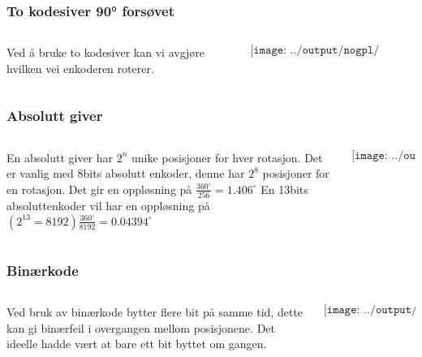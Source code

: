 \documentclass[aspectratio=169,xcolor=dvipsnames]{beamer}
\begin{document}
\begin{frame}
	\frametitle{To kodesiver 90° forsøvet}
	\begin{columns}
		\begin{column}{0.5\textwidth}
Ved å bruke to kodesiver kan vi avgjøre hvilken vei enkoderen roterer. 
		\end{column}

		\begin{column}{0.5\textwidth}
	$$\texttt{[image: ../output/nogpl/TurtallPosisjon04.png]}$$
		\end{column}
	\end{columns}
\end{frame}

\begin{frame}
	\frametitle{Absolutt giver}
	\begin{columns}
		\begin{column}{0.5\textwidth}
			En absolutt giver har $2^n$ unike posisjoner for hver rotasjon. 
			\vskip 1cm
			Det er vanlig med 8bits absolutt enkoder, denne har $2^8$ posisjoner for en rotasjon. Det gir en oppløsning på $\frac{360^\circ}{256}=1.406^\circ$
			\vskip 1cm
			En 13bits absoluttenkoder vil har en oppløsning på $(2^{13}=8192) \frac{360^\circ}{8192} =0.04394^\circ$
		\end{column}

		\begin{column}{0.5\textwidth}
	$$\texttt{[image: ../output/nogpl/TurtallPosisjon05.png]}$$
		\end{column}
	\end{columns}
\end{frame}

\begin{frame}
	\frametitle{Binærkode}
	\begin{columns}
		\begin{column}{0.5\textwidth}
Ved bruk av binærkode bytter flere bit på samme tid, dette kan gi binærfeil i overgangen mellom posisjonene. Det ideelle hadde vært at bare ett bit byttet om gangen. 
			
		\end{column}

		\begin{column}{0.5\textwidth}
	$$\texttt{[image: ../output/nogpl/TurtallPosisjon06.png]}$$
		\end{column}
	\end{columns}
\end{frame}
\end{document}
